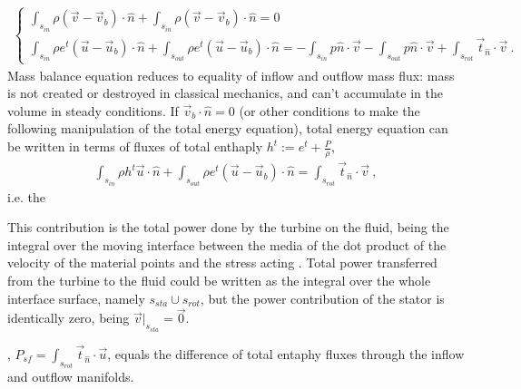 \documentclass[letterpaper,10pt,english]{jupyterBook}
\begin{document}
\begin{equation*}
\begin{split}\begin{cases}
  \displaystyle\int_{s_{in}} \rho ( \vec{v} - \vec{v}_b ) \cdot \hat{n} + \int_{s_{in}} \rho ( \vec{v} - \vec{v}_b ) \cdot \hat{n} = 0 \\ 
  \displaystyle\int_{s_{in}} \rho e^t ( \vec{u} - \vec{u}_b ) \cdot \hat{n} + \int_{s_{out}} \rho e^t ( \vec{u} - \vec{u}_b ) \cdot \hat{n} = - \int_{s_{in}} p \hat{n} \cdot \vec{v} - \int_{s_{out}} p \hat{n} \cdot \vec{v} + \int_{s_{rot}} \vec{t}_{\hat{n}} \cdot \vec{v} \ .
\end{cases}\end{split}
\end{equation*}
\sphinxAtStartPar
Mass balance equation reduces to equality of inflow and outflow mass flux: mass is not created or destroyed in classical mechanics, and can’t accumulate in the volume in steady conditions. If \(\vec{v}_b \cdot \hat{n} = 0\) (or other conditions to make the following manipulation of the total energy equation), total energy equation can be written in terms of fluxes of total enthaply \(h^t := e^t + \frac{P}{\rho}\),
\begin{equation*}
\begin{split}  \displaystyle\int_{s_{in}} \rho h^t \vec{u} \cdot \hat{n} + \int_{s_{out}} \rho e^t ( \vec{u} - \vec{u}_b ) \cdot \hat{n} = \int_{s_{rot}} \vec{t}_{\hat{n}} \cdot \vec{v} \ ,
\end{split}
\end{equation*}
\sphinxAtStartPar
i.e. the %
\begin{footnote}[1]\sphinxAtStartFootnote
This contribution is the total power done by the turbine on the fluid, being the integral over the moving interface between the media of the dot product of the velocity of the material points and the stress acting . Total power transferred from the turbine to the fluid could be written as the integral over the whole interface surface, namely \(s_{sta} \cup s_{rot}\), but the power contribution of the stator is identically zero, being \(\vec{v}|_{s_{sta}} = \vec{0}\).
%
\end{footnote}, \(P_{sf} = \int_{s_{rot}} \vec{t}_{\hat{n}} \cdot \vec{u}\), equals the difference of total entaphy fluxes through the inflow and outflow manifolds.
\end{document}

